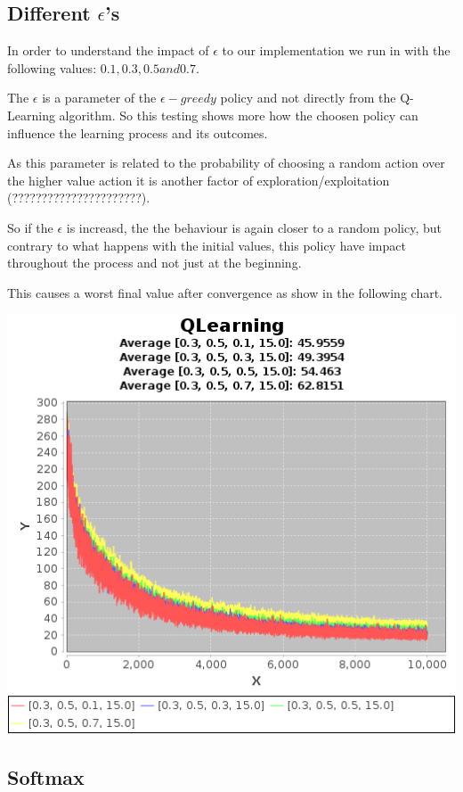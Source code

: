 \documentclass{article}
\begin{document}
\subsection{Different $\epsilon$'s}
In order to understand the impact of $\epsilon$ to our implementation we run
in with the following values:
$0.1, 0.3, 0.5 and 0.7$.

The $\epsilon$ is a parameter of the $\epsilon-greedy$ policy and not directly
from the Q-Learning algorithm. So this testing shows more how the choosen policy can
influence the learning process and its outcomes. 

As this parameter is related to the probability of choosing a random action over
the higher value action it is another factor of exploration/exploitation
(??????????????????????).

So if the $\epsilon$ is increasd, the the behaviour is again closer to a random
policy, but contrary to what happens with the initial values, this policy have
impact throughout the process and not just at the beginning.

This causes a worst final value after convergence as show in the following
chart.

\includegraphics[]{res/alpha_03_gama_05_epsilon_01_to_07_IV_15.png}

\subsection{Softmax}
\label{softmax}
\end{document}

